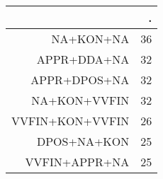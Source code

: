 \begin{tabular}{rr}
  \hline
 & . \\ 
  \hline
NA+KON+NA &  36 \\ 
  APPR+DDA+NA &  32 \\ 
  APPR+DPOS+NA &  32 \\ 
  NA+KON+VVFIN &  32 \\ 
  VVFIN+KON+VVFIN &  26 \\ 
  DPOS+NA+KON &  25 \\ 
  VVFIN+APPR+NA &  25 \\ 
   \hline
\end{tabular}
